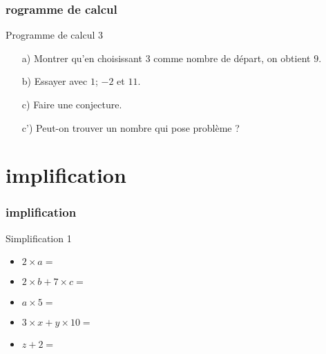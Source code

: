 \documentclass{beamer}
\begin{document}
\begin{frame}
  \frametitle{rogramme de calcul}
  \begin{exampleblock}{Programme de calcul 3}
    
    \begin{multicols}{2}
      
      \begin{enumerate}
      \item[a)] Montrer qu'en choisissant $3$ comme nombre de départ, on obtient $9$.
      \item[b)] Essayer avec $1$; $-2$ et $11$.
      \item[c)] Faire une conjecture.
      \item[c')] Peut-on trouver un nombre qui pose problème ?
      \end{enumerate}
      
    \end{multicols}
  \end{exampleblock}
\end{frame}

\section{implification}

\begin{frame}
  \frametitle{implification}
  \begin{exampleblock}{Simplification 1}
    \begin{itemize}
    \item<1-> $ 2 \times a               = $
    \item<2-> $ 2 \times b + 7 \times c  = $
    \item<3-> $ a \times 5               = $
    \item<4-> $ 3 \times x + y \times 10 = $
    \item<5-> $ z + 2                    = $
    \end{itemize}
  \end{exampleblock}
\end{frame}
\end{document}
